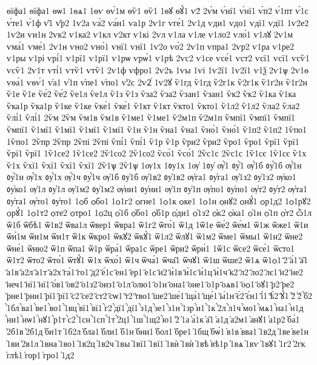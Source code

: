 {ѳїфа1
ѳїфа1
ѳѡ1
1ѳѧ1
1ѳѵ
ѳѵ́1м
ѳѷ1
ѳѷ1
1ѳꙋ
ѳꙋ́1
ѵ2́
2ѵ́м
ѵ́нї1
ѵ́нї1
ѵ́п2
ѵ́1пт
ѵ́1с
ѵ́те1
ѵ́1ф
ѵ̑1
ѵ̑р2
1ѵ2а
ѵа́2
ѵа́н1
ѵа1р
2ѵ1г
ѵге́1
2ѵ1д
ѵди1
ѵдо1
ѵдї1
ѵдї1
1ѵ2е2
1ѵ2и
ѵи1н
2ѵк2
ѵ1ка2
ѵ1кл
ѵ2кт
ѵ1кі
2ѵл
ѵ1ла
ѵ1ле
ѵ1ло2
ѵло́1
ѵ1лꙋ
2ѵ1м
ѵма́1
ѵме́1
2ѵ1н
ѵно2
ѵно́1
ѵнї1
ѵнї1
1ѵ2о
ѵо́2
2ѵ1п
ѵпра1
2ѵр2
ѵ1ра
ѵ1ре2
ѵ1ры
ѵ1рі
ѵрі́1
ѵ1рї1
ѵ1рї1
ѵ1рѡ
ѵрѡ́1
ѵ1рѣ
2ѵс2
ѵ1се
ѵсе́1
ѵст2
ѵсї1
ѵсї1
ѵсѷ1
ѵсѷ1
2ѵ1т
ѵті́1
ѵтѷ1
ѵтѷ1
2ѵ1ф
ѵфро1
2ѵ2ъ
1ѵы
1ѵі
1ѵ2ї1
1ѵ2ї1
ѵ1ѯ
2ѵ1ѱ
2ѵ1ѳ
ѵѳа́1
ѵѳѵ́1
ѵ҆а1
ѵ҆1п
ѵ҆пе1
ѵ҆по1
ѵ҆2с
2ѵ2ⷢ
1ѵ2ꙋ
ѷ1гд
ѷ1гд
ѷ2г1к
ѷ2г1к
ѷ1г2н
ѷ1г2н
ѷ1е
ѷ1е
ѷе́2
ѷе́2
ѷе1л
ѷе1л
ѷ1з
ѷ1з
ѷза2
ѷза2
ѷзан1
ѷзан1
ѷк2
ѷк2
ѷ1ка
ѷ1ка
ѷка1р
ѷка1р
ѷ1ке
ѷ1ке
ѷке́1
ѷке́1
ѷ1кт
ѷ1кт
ѷкто1
ѷкто1
ѷ1л2
ѷ1л2
ѷла2
ѷла2
ѷлі́1
ѷлі́1
2ѷм
2ѷм
ѷм1в
ѷм1в
ѷ1ме1
ѷ1ме1
ѷ2м1п
ѷ2м1п
ѷмпї1
ѷмпї1
ѷмпї1
ѷмпї1
ѷ1мї1
ѷ1мї1
ѷ1мї1
ѷ1мї1
ѷ1н
ѷ1н
ѷна1
ѷна1
ѷно́1
ѷно́1
ѷ1п2
ѷ1п2
1ѷпо1
1ѷпо1
2ѷпр
2ѷпр
2ѷпі
2ѷпі
ѷпі́1
ѷпі́1
ѷ1р
ѷ1р
ѷри2
ѷри2
ѷро1
ѷро1
ѷрї1
ѷрї1
ѷрї1
ѷрї1
1ѷ1се2
1ѷ1се2
2ѷ1со2
2ѷ1со2
ѷсо́1
ѷсо́1
2ѷс1с
2ѷс1с
1ѷ1сє
1ѷ1сє
ѷ1х
ѷ1х
ѷхї1
ѷхї1
ѷхї1
ѷхї1
2ѷ1ѱ
2ѷ1ѱ
1ѹ1х
1ᲂу1х
1ѹ҆
1ᲂу҆
ѹ҆̀1
ᲂу҆̀1
ѹ҆́1б
ᲂу҆́1б
ѹ҆́1н
ᲂу҆́1н
ѹ҆́1х
ᲂу҆́1х
ѹ҆́1ч
ᲂу҆́1ч
ѹ҆1б
ᲂу҆1б
ѹ҆1в2
ᲂу҆1в2
ѹ҆га1
ᲂу҆га1
ѹ҆1з2
ᲂу҆1з2
ѹ҆ко1
ᲂу҆ко1
ѹ҆1л
ᲂу҆1л
ѹ҆1м2
ᲂу҆1м2
ѹ҆ни1
ᲂу҆ни1
ѹ҆1п
ᲂу҆1п
ѹ҆по1
ᲂу҆по1
ѹ҆т2
ᲂу҆т2
ѹ҆та1
ᲂу҆та1
ѹ҆то1
ᲂу҆то1
1ѻб
ѻбо1
1ѻ1г2
ѻгне1
1ѻ1к
ѻке1
1ѻ1н
ѻнꙋ2
ѻнꙋ́1
ѻр1д2
1ѻ1рꙋ2
ѻрꙋ́1
1ѻ1т2
ѻте2
ѻтро1
1ѻ2ц
ѻ҆1б
ѻ҆бо1
ѻ҆б1р
ѻ҆ди1
ѻ҆1з2
ѻ҆к2
ѻ҆ка1
ѻ҆1н
ѻ҆1п
ѻ҆т2
ѽ1л
ѿ1б
ѿбѣ1
ѿ1в2
ѿва1л
ѿвер1
ѿвра1
ѿ1г2
ѿго́1
ѿ1д
1ѿ1е
ѿе́2
ѿе́м1
ѿ1ж
ѿже1
ѿ1и
ѿи́1м
ѿи1м
ѿи1т
ѿ1к
ѿкро1
ѿкꙋ2
ѿкꙋ́1
ѿ1л2
ѿлꙋ1
ѿ1м2
ѿме1
ѿмы1
ѿ1н2
ѿне2
ѿне́1
ѿню2
ѿ1п
ѿпа1
ѿ1р
ѿра́1
ѿра1с
ѿре1
ѿри2
ѿри́1
1ѿ1с
ѿсе2
ѿсе́1
ѿсто1
ѿ1т2
ѿто2
ѿто́1
ѿтꙋ́1
ѿ1х
ѿхо́1
ѿ1ч
ѿча́1
ѿча̑1
ѿчꙋ1
ѿ1ш
ѿше2
ѿ1ѧ
ѿ1ѻ1
҃2
҃а́1
҃а̑1
҃а1в
҃а2л
҃а1т
҃а2х
҃га́1
҃го1
҃д2
҃е́1с
҃ен1
҃ер1
҃е1с
҃и2
҃и́1в
҃и́1с
҃и́1ц
҃и́1ч
҃к2
҃л2
҃ло2
҃лє1
҃н2
҃не2
҃неч1
҃нї1
҃нї1
҃о́в1
҃ов2
҃о1з2
҃оиз1
҃о1л
҃олю1
҃о1н
҃она1
҃оне1
҃о1р
҃оѧв1
҃оѻ1
҃оꙋ1
҃р2
҃ре2
҃рне1
҃рни1
҃рї1
҃рї1
҃с2
҃се2
҃ст2
҃сѡ1
҃т2
҃тво1
҃ше2
҃ше́1
҃ща́1
҃ще́1
҃ы́1н
҃є́2
҃є́н1
҃і́1
҃ѣ́2
҃ꙋ́1
҆2̀
҆2́
҆́б2
҆́1бл
҆́ва1
҆́ве1
҆́во1
҆́1вц
҆́вї1
҆́вї1
҆́г2
҆́дї1
҆́дї1
҆́з1д
҆́зе1
҆́з1н
҆́1зр
҆́и1
҆́1к
҆́2л
҆́л1ч
҆́мо1
҆́мѧ1
҆́на1
҆́н1д
҆́ни1
҆́нѡ1
҆́нꙋ1
҆́р1т
҆́с2
҆́1сн
҆́1сп
҆́1т
҆́2ц1
҆́1ш
҆́1щ2
҆́ю1
҆2̑
҆1а
҆а́1к
҆а̑1
҆а1д
҆а2м1
҆анꙋ1
҆а1р2
҆ба́1
҆2б1в
҆2б1д
҆би1т
҆1б2л
҆бла1
҆бли1
҆б1н
҆бни1
҆бол1
҆бре1
҆1бщ
҆бѡ́1
҆в1в
҆вва1
҆1в2д
҆1ве
҆ве1н
҆1ви
҆2в1л
҆1вна
҆1во1
҆1в2ц
҆1в2ч
҆1вы
҆1вї1
҆1вї1
҆1вѝ
҆1вѝ
҆1вѣ
҆вѣ1р
҆1вѧ
҆1вѵ
҆1вꙋ1
҆1г2
҆2гк
҆глѣ1
҆гор1
҆гро1
҆1д2
}
